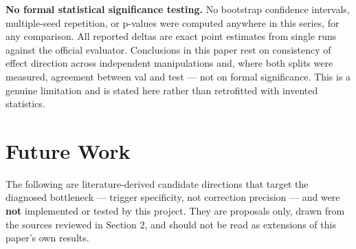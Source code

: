 \documentclass[11pt]{article}
\begin{document}
\textbf{No formal statistical significance testing.} No bootstrap confidence intervals, multiple-seed repetition, or p-values were computed anywhere in this series, for any comparison. All reported deltas are exact point estimates from single runs against the official evaluator. Conclusions in this paper rest on consistency of effect direction across independent manipulations and, where both splits were measured, agreement between val and test — not on formal significance. This is a genuine limitation and is stated here rather than retrofitted with invented statistics.

\section{Future Work}

The following are literature-derived candidate directions that target the diagnosed bottleneck — trigger specificity, not correction precision — and were \textbf{not} implemented or tested by this project. They are proposals only, drawn from the sources reviewed in Section 2, and should not be read as extensions of this paper's own results.
\end{document}
